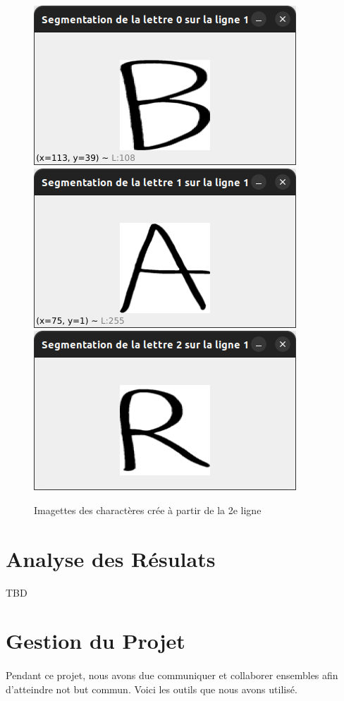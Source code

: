 \documentclass[a4paper]{article}
\begin{document}
			\begin{figure}
				\caption{Imagettes des charactères crée à partir de la 2e ligne}
				\includegraphics[scale=.3]{segmentation_B.png}
				\centering
				\includegraphics[scale=.3]{segmentation_A.png}
				\centering
				\includegraphics[scale=.3]{segmentation_R.png}
				\centering
			\end{figure}
	\newpage
	\section{Analyse des Résulats}
		TBD
	\section{Gestion du Projet}
		\paragraph{} Pendant ce projet, nous avons due communiquer et collaborer ensembles afin d'atteindre not but commun. Voici les outils que nous avons utilisé.
\end{document}
